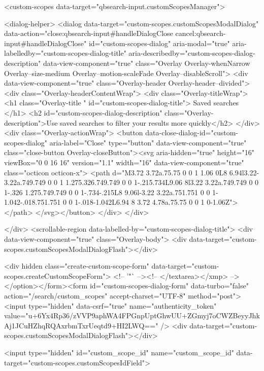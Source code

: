     <custom-scopes data-target="qbsearch-input.customScopesManager">
    
<dialog-helper>
  <dialog data-target="custom-scopes.customScopesModalDialog" data-action="close:qbsearch-input#handleDialogClose cancel:qbsearch-input#handleDialogClose" id="custom-scopes-dialog" aria-modal="true" aria-labelledby="custom-scopes-dialog-title" aria-describedby="custom-scopes-dialog-description" data-view-component="true" class="Overlay Overlay-whenNarrow Overlay--size-medium Overlay--motion-scaleFade Overlay--disableScroll">
    <div data-view-component="true" class="Overlay-header Overlay-header--divided">
  <div class="Overlay-headerContentWrap">
    <div class="Overlay-titleWrap">
      <h1 class="Overlay-title " id="custom-scopes-dialog-title">
        Saved searches
      </h1>
        <h2 id="custom-scopes-dialog-description" class="Overlay-description">Use saved searches to filter your results more quickly</h2>
    </div>
    <div class="Overlay-actionWrap">
      <button data-close-dialog-id="custom-scopes-dialog" aria-label="Close" type="button" data-view-component="true" class="close-button Overlay-closeButton"><svg aria-hidden="true" height="16" viewBox="0 0 16 16" version="1.1" width="16" data-view-component="true" class="octicon octicon-x">
    <path d="M3.72 3.72a.75.75 0 0 1 1.06 0L8 6.94l3.22-3.22a.749.749 0 0 1 1.275.326.749.749 0 0 1-.215.734L9.06 8l3.22 3.22a.749.749 0 0 1-.326 1.275.749.749 0 0 1-.734-.215L8 9.06l-3.22 3.22a.751.751 0 0 1-1.042-.018.751.751 0 0 1-.018-1.042L6.94 8 3.72 4.78a.75.75 0 0 1 0-1.06Z"></path>
</svg></button>
    </div>
  </div>
  
</div>
      <scrollable-region data-labelled-by="custom-scopes-dialog-title">
        <div data-view-component="true" class="Overlay-body">        <div data-target="custom-scopes.customScopesModalDialogFlash"></div>

        <div hidden class="create-custom-scope-form" data-target="custom-scopes.createCustomScopeForm">
        <!-- '"` --><!-- </textarea></xmp> --></option></form><form id="custom-scopes-dialog-form" data-turbo="false" action="/search/custom_scopes" accept-charset="UTF-8" method="post"><input type="hidden" data-csrf="true" name="authenticity_token" value="u+6Yx4Rp36/zVVP9aphWA4FPGnpUptGhwUU+ZGmyj7oCWZBeyyJhkAj1JCuHZhqRQAxrbmTxrUeqtd9+HI2LWQ==" />
          <div data-target="custom-scopes.customScopesModalDialogFlash"></div>

          <input type="hidden" id="custom_scope_id" name="custom_scope_id" data-target="custom-scopes.customScopesIdField">

